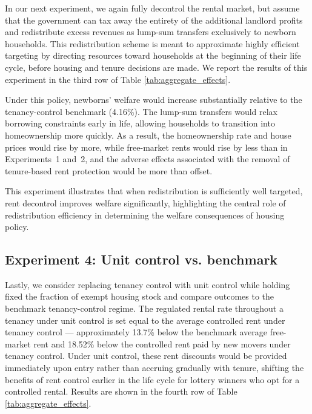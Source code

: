 \documentclass[parskip=full]{article}
\begin{document}
In our next experiment, we again fully decontrol the rental market, but assume that the government can tax away the entirety of the additional landlord profits and redistribute excess revenues as lump-sum transfers exclusively to newborn households. This redistribution scheme is meant to approximate highly efficient targeting by directing resources toward households at the beginning of their life cycle, before housing and tenure decisions are made. We report the results of this experiment in the third row of Table \ref{tab:aggregate_effects}.

Under this policy, newborns’ welfare would increase substantially relative to the tenancy-control benchmark (4.16\%). The lump-sum transfers would relax borrowing constraints early in life, allowing households to transition into homeownership more quickly. As a result, the homeownership rate and house prices would rise by more, while free-market rents would rise by less than in Experiments~1 and~2, and the adverse effects associated with the removal of tenure-based rent protection would be more than offset.

This experiment illustrates that when redistribution is sufficiently well targeted, rent decontrol improves welfare significantly, highlighting the central role of redistribution efficiency in determining the welfare consequences of housing policy.

\subsection{Experiment 4: Unit control vs. benchmark}\label{sec:exp_4}

Lastly, we consider replacing tenancy control with unit control while holding fixed the fraction of exempt housing stock and compare outcomes to the benchmark tenancy-control regime. The regulated rental rate throughout a tenancy under unit control is set equal to the average controlled rent under tenancy control — approximately 13.7\% below the benchmark average free-market rent and 18.52\% below the controlled rent paid by new movers under tenancy control. Under unit control, these rent discounts would be provided immediately upon entry rather than accruing gradually with tenure, shifting the benefits of rent control earlier in the life cycle for lottery winners who opt for a controlled rental. Results are shown in the fourth row of Table \ref{tab:aggregate_effects}.
\end{document}
